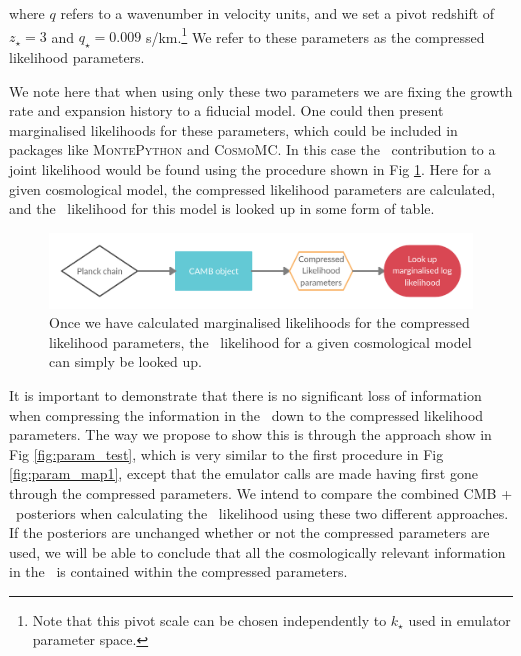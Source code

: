 \documentclass[preprintnumbers,prd,superscriptaddress,notitlepage,nofootinbib] {revtex4-1}
\def\afrhid#1{}
\begin{document}
where $q$ refers to a wavenumber in velocity units, and we set a pivot
redshift of $z_\star=3$ and $q_\star=0.009$ s/km.\footnote{Note that this pivot
scale can be chosen independently to $k_\star$ used in emulator parameter space.}
We refer to these parameters as the compressed likelihood parameters.
\afrhid{It might be useful to highlight that this pivot point does not need to match the
pivot point in the emulator.}
We note here that when using
only these two parameters we are fixing the growth rate and expansion
history to a fiducial model. One could then present marginalised likelihoods for
these parameters, which could be included in packages like \textsc{MontePython}
and \textsc{CosmoMC}. In this case the \lyaf\ contribution to a joint likelihood
would be found using the procedure shown in Fig \ref{fig:marginalised_compressed}.
Here for a given cosmological model, the compressed likelihood parameters are calculated,
and the \lyaf\ likelihood for this model is looked up in some form of table.

\begin{figure}[ht]
    \begin{center}
     \includegraphics[scale=0.2]{Figures/Marginalised_compressed.png}
    \end{center}
    \caption{Once we have calculated marginalised likelihoods for the compressed
    likelihood parameters, the \lyaf\ likelihood for a given cosmological model
    can simply be looked up.}
    \label{fig:marginalised_compressed}
\end{figure}

It is important to demonstrate that there is no significant loss of information
when compressing the information in the \lyaf\ down to the compressed likelihood
parameters. The way we propose to show this is through the approach show in
Fig \ref{fig:param_test}, which is very similar to the first procedure in Fig
\ref{fig:param_map1}, except that the emulator calls are made having first gone
through the compressed parameters. We intend to compare the combined CMB + \lyaf\
posteriors when calculating the \lyaf\ likelihood using these two different approaches.
If the posteriors are unchanged whether or not the compressed parameters are used,
we will be able to conclude that all the cosmologically relevant information
in the \lyaf\ is contained within the compressed parameters.
\end{document}
